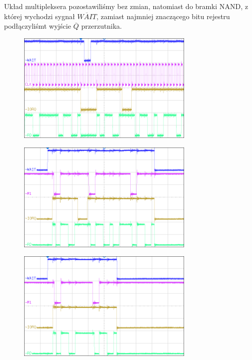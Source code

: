 \documentclass[fleqn]{article}
\begin{document}
Układ multipleksera pozostawiliśmy bez zmian, natomiast do bramki NAND, z której wychodzi sygnał $\overline{WAIT}$, zamiast najmniej znaczącego bitu rejestru podłączyliśmt wyjście $\overline{Q}$ przerzutnika.


\begin{figure}[H]
	\centering
	\includegraphics[width=0.75\textwidth]{img/3a.png}
	\caption{}
\end{figure}

\begin{figure}[H]
	\centering
	\includegraphics[width=0.75\textwidth]{img/3b.png}
	\caption{}
\end{figure}

\begin{figure}[H]
	\centering
	\includegraphics[width=0.75\textwidth]{img/3c.png}
	\caption{}
\end{figure}
\end{document}
